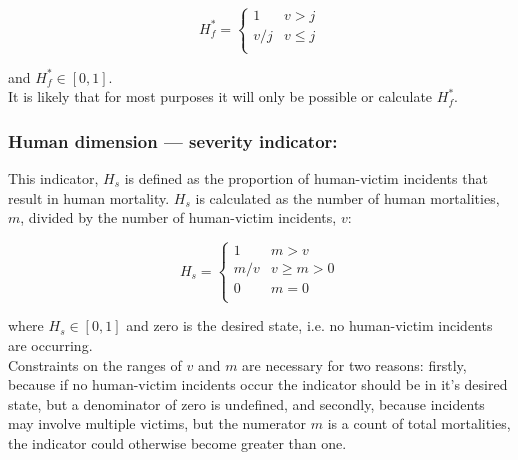 \documentclass[fleqn,10pt]{olplainarticle}
\begin{document}
\begin{equation*}
    H_f^\ast = \begin{cases}
        1       & v > j \\
        v/j & v \le j \\
    \end{cases}
\end{equation*}

and $H_f^\ast \in [0,1]$.\\

It is likely that for most purposes it will only be possible or calculate $H_f^\ast$.\\


\subsubsection*{Human dimension --- severity indicator:}
This indicator, $H_s$ is defined as the proportion of human-victim incidents that result in human mortality. $H_s$ is calculated as the number of human mortalities, $m$, divided by the number of human-victim incidents, $v$:

\begin{equation*}
    H_s = \begin{cases}
        1 & m > v \\
        m/v & v \ge m > 0 \\
        0       & m = 0 \\
    \end{cases}
\end{equation*}



where $H_s \in [0,1]$ and zero is the desired state, i.e. no human-victim incidents are occurring. \\

Constraints on the ranges of $v$ and $m$ are necessary for two reasons: firstly, because if no human-victim incidents occur the indicator should be in it's desired state, but a denominator of zero is undefined, and secondly,  because incidents may involve multiple victims, but the numerator $m$ is a count of total mortalities, the indicator could otherwise become greater than one.\\
\end{document}
